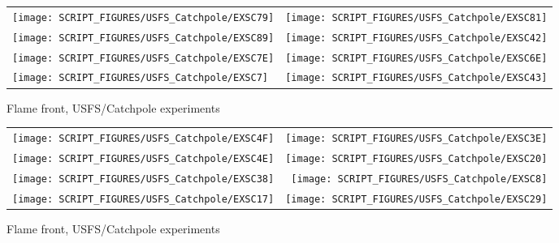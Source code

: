 \begin{figure}[p]
\begin{tabular*}{\textwidth}{l@{\extracolsep{\fill}}r}
\texttt{[image: SCRIPT\_FIGURES/USFS\_Catchpole/EXSC79]} &
\texttt{[image: SCRIPT\_FIGURES/USFS\_Catchpole/EXSC81]} \\
\texttt{[image: SCRIPT\_FIGURES/USFS\_Catchpole/EXSC89]} &
\texttt{[image: SCRIPT\_FIGURES/USFS\_Catchpole/EXSC42]} \\
\texttt{[image: SCRIPT\_FIGURES/USFS\_Catchpole/EXSC7E]} &
\texttt{[image: SCRIPT\_FIGURES/USFS\_Catchpole/EXSC6E]} \\
\texttt{[image: SCRIPT\_FIGURES/USFS\_Catchpole/EXSC7]} &
\texttt{[image: SCRIPT\_FIGURES/USFS\_Catchpole/EXSC43]} \\
\end{tabular*}
\caption[Flame front, USFS/Catchpole experiments]{Flame front, USFS/Catchpole experiments}
\label{USFS_Catchpole_136}
\end{figure}

\begin{figure}[p]
\begin{tabular*}{\textwidth}{l@{\extracolsep{\fill}}r}
\texttt{[image: SCRIPT\_FIGURES/USFS\_Catchpole/EXSC4F]} &
\texttt{[image: SCRIPT\_FIGURES/USFS\_Catchpole/EXSC3E]} \\
\texttt{[image: SCRIPT\_FIGURES/USFS\_Catchpole/EXSC4E]} &
\texttt{[image: SCRIPT\_FIGURES/USFS\_Catchpole/EXSC20]} \\
\texttt{[image: SCRIPT\_FIGURES/USFS\_Catchpole/EXSC38]} &
\texttt{[image: SCRIPT\_FIGURES/USFS\_Catchpole/EXSC8]} \\
\texttt{[image: SCRIPT\_FIGURES/USFS\_Catchpole/EXSC17]} &
\texttt{[image: SCRIPT\_FIGURES/USFS\_Catchpole/EXSC29]} \\
\end{tabular*}
\caption[Flame front, USFS/Catchpole experiments]{Flame front, USFS/Catchpole experiments}
\label{USFS_Catchpole_144}
\end{figure}

